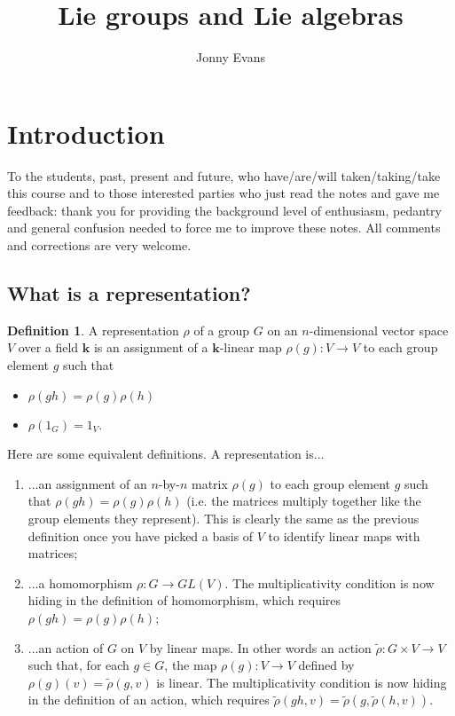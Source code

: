 \documentclass[12pt]{article}
\title{Lie groups and Lie algebras}
\author{Jonny Evans}
\newcommand{\kk}{\mathbf{k}}
\theoremstyle{definition}
\newtheorem{dfn}[thm]{Definition}
\theoremstyle{check}
\theoremstyle{remark}
\theoremstyle{TheoremNum}
\begin{document}
\maketitle

\section{Introduction}

To the students, past, present and future, who have/are/will taken/taking/take this course and to those interested parties who just read the notes and gave me feedback: thank you for providing the background level of enthusiasm, pedantry and general confusion needed to force me to improve these notes. All comments and corrections are very welcome.

\subsection{What is a representation?}

\begin{dfn}
A representation $\rho$ of a group $G$ on an $n$-dimensional vector space $V$ over a field $\kk$ is an assignment of a $\kk$-linear map $\rho(g)\colon V\to V$ to each group element $g$ such that
\begin{itemize}
\item $\rho(gh)=\rho(g)\rho(h)$
\item $\rho(1_G)=1_V$.
\end{itemize}
\end{dfn}

Here are some equivalent definitions. A representation is...

\begin{enumerate}
\item ...an assignment of an $n$-by-$n$ matrix $\rho(g)$ to each group element $g$ such that $\rho(gh)=\rho(g)\rho(h)$ (i.e. the matrices multiply together like the group elements they represent). This is clearly the same as the previous definition once you have picked a basis of $V$ to identify linear maps with matrices;
\item ...a homomorphism $\rho\colon G\to GL(V)$. The multiplicativity condition is now hiding in the definition of homomorphism, which requires $\rho(gh)=\rho(g)\rho(h)$;
\item ...an action of $G$ on $V$ by linear maps. In other words an action $\tilde{\rho}\colon G\times V\to V$ such that, for each $g\in G$, the map $\rho(g)\colon V\to V$ defined by $\rho(g)(v)=\tilde{\rho}(g,v)$ is linear. The multiplicativity condition is now hiding in the definition of an action, which requires $\tilde{\rho}(gh,v)=\tilde{\rho}(g,\tilde{\rho}(h,v))$.
\end{enumerate}
\end{document}
